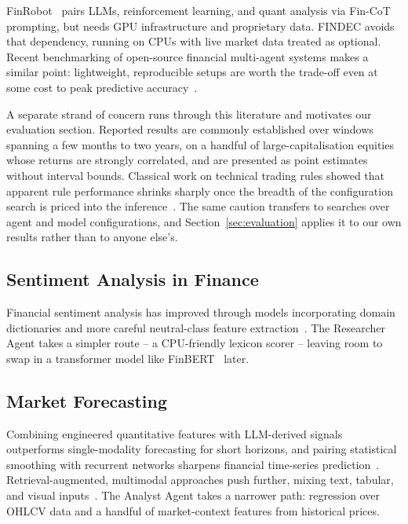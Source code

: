 \documentclass[conference]{IEEEtran}
\begin{document}
FinRobot~\cite{yang2024finrobot} pairs LLMs, reinforcement learning, and quant analysis via Fin-CoT prompting, but needs GPU infrastructure and proprietary data. FINDEC avoids that dependency, running on CPUs with live market data treated as optional. Recent benchmarking of open-source financial multi-agent systems makes a similar point: lightweight, reproducible setups are worth the trade-off even at some cost to peak predictive accuracy~\cite{zhang2026finworld}.

A separate strand of concern runs through this literature and motivates our evaluation section. Reported results are commonly established over windows spanning a few months to two years, on a handful of large-capitalisation equities whose returns are strongly correlated, and are presented as point estimates without interval bounds. Classical work on technical trading rules showed that apparent rule performance shrinks sharply once the breadth of the configuration search is priced into the inference~\cite{sullivan1999data}. The same caution transfers to searches over agent and model configurations, and Section~\ref{sec:evaluation} applies it to our own results rather than to anyone else's.

\subsection{Sentiment Analysis in Finance}

Financial sentiment analysis has improved through models incorporating domain dictionaries and more careful neutral-class feature extraction~\cite{sun2025financial}. The Researcher Agent takes a simpler route -- a CPU-friendly lexicon scorer -- leaving room to swap in a transformer model like FinBERT~\cite{araci2019finbert} later.

\subsection{Market Forecasting}

Combining engineered quantitative features with LLM-derived signals outperforms single-modality forecasting for short horizons, and pairing statistical smoothing with recurrent networks sharpens financial time-series prediction~\cite{gagneja2026lstm}. Retrieval-augmented, multimodal approaches push further, mixing text, tabular, and visual inputs~\cite{jiang2025multimodal}. The Analyst Agent takes a narrower path: regression over OHLCV data and a handful of market-context features from historical prices.
\end{document}
